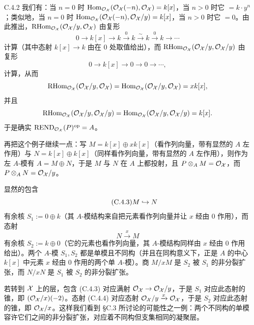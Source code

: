 \begin{exam}{C.4.2}
我们有：当 $n=0$ 时 $\operatorname{Hom}_{\mathcal{O}_{\mathcal{X}}}(\mathcal{O}_{\mathcal{X}}(-n),\mathcal{O}_{\mathcal{X}})=k[x]$，当 $n>0$ 时它 $=k\cdot y^n$；类似地，当 $n=0$ 时 $\operatorname{Hom}_{\mathcal{O}_{\mathcal{X}}}(\mathcal{O}_{\mathcal{X}}(-n),\mathcal{O}_{\mathcal{X}}/y)=k[x]$，当 $n>0$ 时它 $=0$。由此推出，$\mathrm{RHom}_{\mathcal{O}_{\mathcal{X}}}(\mathcal{O}_{\mathcal{X}}/y,\mathcal{O}_{\mathcal{X}})$ 由复形
\[
0\to k[x]\to k\xrightarrow{0}k\xrightarrow{\sim}k\xrightarrow{0}k\to\cdots
\]
计算（其中态射 $k[x]\to k$ 由在 $0$ 处取值给出），而 $\mathrm{RHom}_{\mathcal{O}_{\mathcal{X}}}(\mathcal{O}_{\mathcal{X}}/y,\mathcal{O}_{\mathcal{X}}/y)$ 由复形
\[
0\to k[x]\to0\to0\to\cdots,
\]
计算，从而
\[
\mathrm{RHom}_{\mathcal{O}_{\mathcal{X}}}(\mathcal{O}_{\mathcal{X}}/y,\mathcal{O}_{\mathcal{X}})=\operatorname{Hom}_{\mathcal{O}_{\mathcal{X}}}(\mathcal{O}_{\mathcal{X}}/y,\mathcal{O}_{\mathcal{X}})=xk[x],
\]
并且
\[
\mathrm{RHom}_{\mathcal{O}_{\mathcal{X}}}(\mathcal{O}_{\mathcal{X}}/y,\mathcal{O}_{\mathcal{X}}/y)=\operatorname{Hom}_{\mathcal{O}_{\mathcal{X}}}(\mathcal{O}_{\mathcal{X}}/y,\mathcal{O}_{\mathcal{X}}/y)=k[x].
\]
于是确实 $\mathrm{REND}_{\mathcal{O}_{\mathcal{X}}}(P)^{\mathrm{op}}=A$。

再把这个例子继续一点：写 $M=k[x]\oplus xk[x]$（看作列向量，带有显然的 $A$ 左作用）与 $N=k[x]\oplus k[x]$（同样看作列向量，带有显然的 $A$ 左作用），则作为左 $A$-模有 $A=M\oplus N$，于是 $M$ 与 $N$ 在 $A$ 上都投射，且 $P\otimes_AM=\mathcal{O}_{\mathcal{X}}$，而 $P\otimes_AN=\mathcal{O}_{\mathcal{X}}/y$。

显然的包含
\begin{equation}\tag{C.4.3}\label{eq:a4-19-4}
M\hookrightarrow N
\end{equation}
有余核 $S_1:=0\oplus k$（其 $A$-模结构来自把元素看作列向量并让 $x$ 经由 $0$ 作用），而态射
\begin{equation}\tag{C.4.4}\label{eq:a4-19-5}
N\xrightarrow{x}M
\end{equation}
有余核 $S_2:=k\oplus0$（它的元素也看作列向量，其 $A$-模结构同样由 $x$ 经由 $0$ 作用给出）。两个 $A$-模 $S_1,S_2$ 都是单模且不同构（并且在同构意义下，正是 $A$ 的中心 $k[x]$ 中元素 $x$ 经由 $0$ 作用的两个单 $A$-模）。商 $M/xM$ 是 $S_2$ 被 $S_1$ 的非分裂扩张，而 $N/xN$ 是 $S_1$ 被 $S_2$ 的非分裂扩张。


若转到 $\mathcal{X}$ 上的层，包含 (C.4.3) 对应满射 $\mathcal{O}_{\mathcal{X}}\to\mathcal{O}_{\mathcal{X}}/y$，于是 $S_1$ 对应此态射的锥，即 $(\mathcal{O}_{\mathcal{X}}/x)(-2)$。态射 (C.4.4) 对应态射 $\mathcal{O}_{\mathcal{X}}/y\xrightarrow{x}\mathcal{O}_{\mathcal{X}}$，于是 $S_2$ 对应此态射的锥，即 $\mathcal{O}_{\mathcal{X}}/x$。这样我们看到 §C.3 所讨论的可能性之一例：两个不同构的单模容许它们之间的非分裂扩张，对应着不同构但支集相同的凝聚层。
\end{exam}

